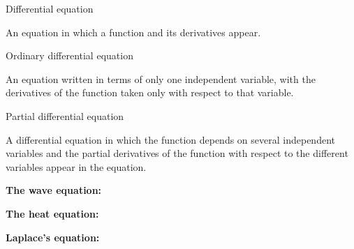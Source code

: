 \EMhold


\begin{EMdefinition}{Differential equation}

An equation in which a function and its derivatives appear.

\end{EMdefinition}

\begin{EMdefinition}{Ordinary differential equation}

An equation written in terms of only one independent variable, with the derivatives of the function taken only with respect to that variable.

\end{EMdefinition}

\begin{EMdefinition}{Partial differential equation}

A differential equation in which the function depends on several independent variables and the partial derivatives of the function with respect to the different variables appear in the equation.

\end{EMdefinition}

\textbf{The wave equation:}

\textbf{The heat equation:}

\textbf{Laplace's equation:}


